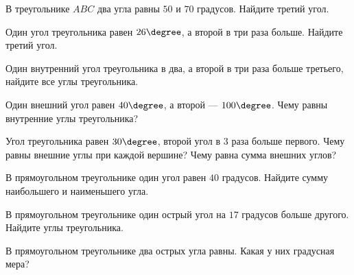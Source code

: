 \begin{class}[number=1-2]
	\begin{listofex}
		\item В треугольнике \( ABC \) два угла равны \( 50\) и \( 70 \) градусов. Найдите третий угол.
		\item Один угол треугольника равен \( 26\degree \), а второй в три раза больше. Найдите третий угол.
		\item Один внутренний угол треугольника в два, а второй в три раза больше третьего, найдите все углы треугольника.
		\item Один внешний угол равен \( 40\degree \), а второй --- \( 100\degree \). Чему равны внутренние углы треугольника?
		\item Угол треугольника равен \( 30\degree \), второй угол в \( 3 \) раза больше первого. Чему равны внешние углы при каждой вершине? Чему равна сумма внешних углов?
		\item В прямоугольном треугольнике один угол равен \( 40 \) градусов. Найдите сумму наибольшего и наименьшего угла.
		\item В прямоугольном треугольнике один острый угол на \( 17 \) градусов больше другого. Найдите углы треугольника.
		\item В прямоугольном треугольнике два острых угла равны. Какая у них градусная мера?
	\end{listofex}
\end{class}


